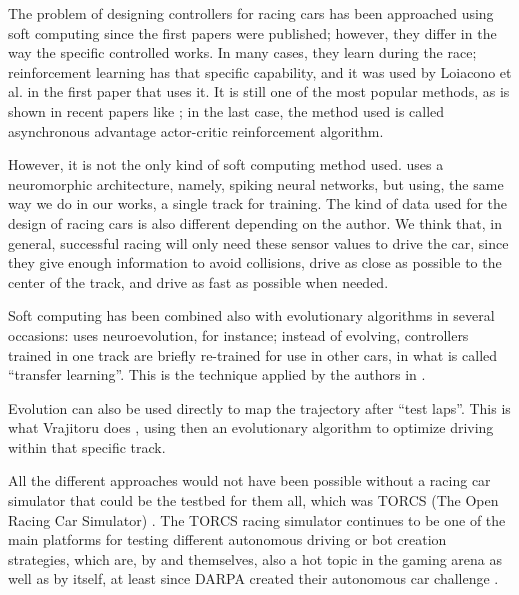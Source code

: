 \documentclass[10pt,journal,compsoc]{IEEEtran}
\begin{document}
The problem of designing controllers for racing cars has been
approached using soft computing since the first papers were
published; however, they differ in the way the specific controlled
works. In many cases, they learn during the race; reinforcement
learning has that specific capability, and it was used by Loiacono et
al. \cite{loiacono2010learning} in the first paper that uses it. It is still one of the most popular methods, as is shown
in recent papers like \cite{giani2019desing,remondaformula,waghdistributed}; in the last
case, the method used is called asynchronous advantage actor-critic
reinforcement algorithm.

However, it is not the only kind of soft computing method
used. \cite{mirus2019short} uses a neuromorphic architecture, namely,
spiking neural networks, but using, the same way we do in our works, a single track for training. The kind of data used for the design of racing cars is
also different depending on the author. We think that, in general, successful racing will only need these sensor values to drive the car, since they give enough information to avoid collisions, drive as close as possible to the
center of the track, and drive as fast as possible when needed.

Soft computing has been combined also with evolutionary algorithms 
in several occasions: \cite{10.1371/journal.pone.0213193} uses
neuroevolution, for instance; instead of evolving, controllers trained
in one track are briefly re-trained for use in other cars, in what is
called ``transfer learning''. This is the technique applied by the authors in 
\cite{verma2018programmatically}. 


Evolution can also be used directly to map the trajectory after ``test
laps''. This is what Vrajitoru does \cite{vrajitoru2019trajectory,vrajitorugenetic}, using then an evolutionary algorithm to optimize driving within that specific track. 



All the different approaches would not have been possible without a
racing car simulator that could be the testbed for them all, which was
TORCS (The Open Racing Car Simulator) \cite{torcs4}. The TORCS racing simulator
continues to be one of the main platforms  
for testing different autonomous driving or bot creation strategies,
which are, by and themselves, also a hot topic in the gaming arena as
well as by itself, at least since DARPA created their autonomous car
challenge \cite{badue2019selfdriving}.
\end{document}
